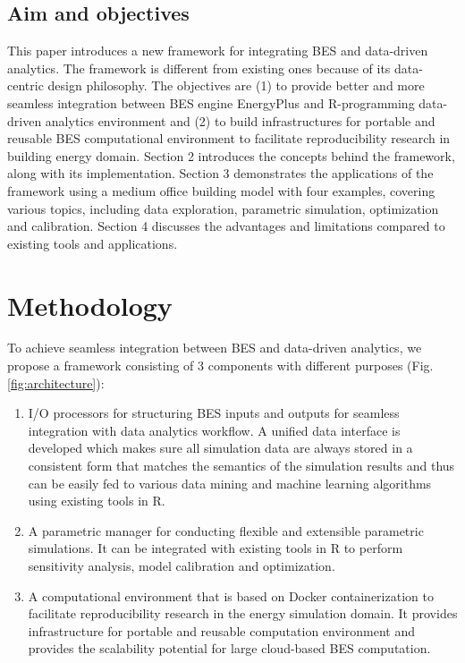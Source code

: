 \documentclass[3p, times]{elsarticle} %
\providecommand{\tightlist}{%
  \setlength{\itemsep}{0pt}\setlength{\parskip}{0pt}}
\begin{document}
\hypertarget{aim-and-objectives}{%
\subsection{Aim and objectives}\label{aim-and-objectives}}

This paper introduces a new framework for integrating BES and data-driven
analytics.
The framework is different from existing ones because of its data-centric
design philosophy.
The objectives are (1) to provide better and more seamless integration between
BES engine EnergyPlus and R-programming data-driven analytics environment
and (2) to build infrastructures for portable and reusable BES
computational environment to facilitate reproducibility research in building
energy domain.
Section 2 introduces the concepts behind the framework, along with its implementation.
Section 3 demonstrates the applications of the framework using a medium office
building model with four examples, covering various topics, including data
exploration, parametric simulation, optimization and calibration.
Section 4 discusses the advantages and limitations compared to existing tools
and applications.

\hypertarget{methodology}{%
\section{Methodology}\label{methodology}}

To achieve seamless integration between BES and data-driven analytics, we
propose a framework consisting of 3 components with different purposes (Fig. \ref{fig:architecture}):

\begin{enumerate}
\def\labelenumi{\arabic{enumi}.}
\tightlist
\item
  I/O processors for structuring BES inputs and outputs for seamless
  integration with data analytics workflow. A unified data interface is
  developed which makes sure all simulation data are always stored in a
  consistent form that matches the semantics of the simulation results and
  thus can be easily fed to various data mining and machine learning
  algorithms using existing tools in R.
\item
  A parametric manager for conducting flexible and extensible parametric
  simulations. It can be integrated with existing tools in R to perform
  sensitivity analysis, model calibration and optimization.
\item
  A computational environment that is based on Docker containerization
  \citep{Merkel2014} to facilitate reproducibility research in the energy
  simulation domain. It provides infrastructure for portable and reusable
  computation environment and provides the scalability potential for large
  cloud-based BES computation.
\end{enumerate}
\end{document}
